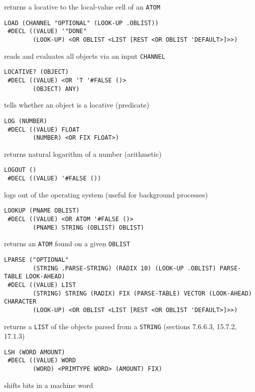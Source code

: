 \documentclass[a4paper,]{article}
\begin{document}
returns a locative to the local-value cell of an \texttt{ATOM}

\begin{verbatim}
LOAD (CHANNEL "OPTIONAL" (LOOK-UP .OBLIST))
 #DECL ((VALUE) '"DONE"
        (LOOK-UP) <OR OBLIST <LIST [REST <OR OBLIST 'DEFAULT>]>>)
\end{verbatim}

reads and evaluates all objects via an input \texttt{CHANNEL}

\begin{verbatim}
LOCATIVE? (OBJECT)
 #DECL ((VALUE) <OR 'T '#FALSE ()>
        (OBJECT) ANY)
\end{verbatim}

tells whether an object is a locative (predicate)

\begin{verbatim}
LOG (NUMBER)
 #DECL ((VALUE) FLOAT
        (NUMBER) <OR FIX FLOAT>)
\end{verbatim}

returns natural logarithm of a number (arithmetic)

\begin{verbatim}
LOGOUT ()
 #DECL ((VALUE) '#FALSE ())
\end{verbatim}

logs out of the operating system (useful for background processes)

\begin{verbatim}
LOOKUP (PNAME OBLIST)
 #DECL ((VALUE) <OR ATOM '#FALSE ()>
        (PNAME) STRING (OBLIST) OBLIST)
\end{verbatim}

returns an \texttt{ATOM} found on a given \texttt{OBLIST}

\begin{verbatim}
LPARSE ("OPTIONAL"
        (STRING .PARSE-STRING) (RADIX 10) (LOOK-UP .OBLIST) PARSE-TABLE LOOK-AHEAD)
 #DECL ((VALUE) LIST
        (STRING) STRING (RADIX) FIX (PARSE-TABLE) VECTOR (LOOK-AHEAD) CHARACTER
        (LOOK-UP) <OR OBLIST <LIST [REST <OR OBLIST 'DEFAULT>]>>)
\end{verbatim}

returns a \texttt{LIST} of the objects parsed from a \texttt{STRING} (sections 7.6.6.3, 15.7.2, 17.1.3)

\begin{verbatim}
LSH (WORD AMOUNT)
 #DECL ((VALUE) WORD
        (WORD) <PRIMTYPE WORD> (AMOUNT) FIX)
\end{verbatim}

shifts bits in a machine word
\end{document}

